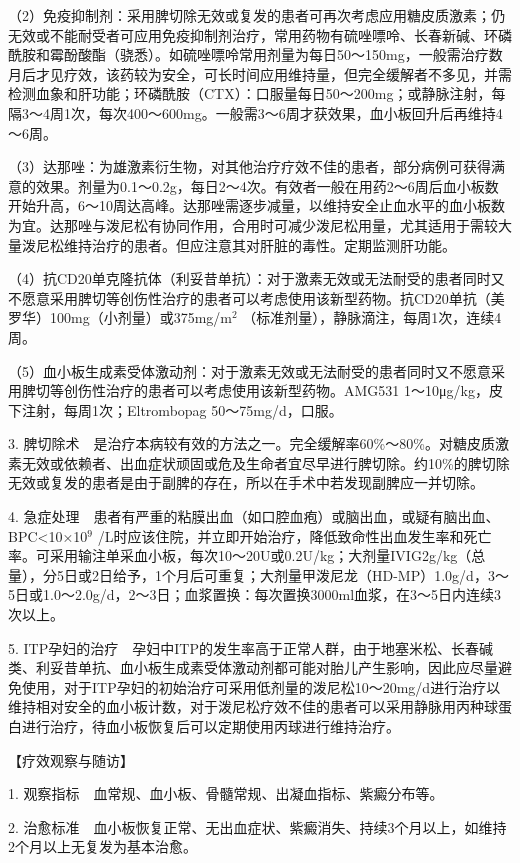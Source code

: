 （2）免疫抑制剂：采用脾切除无效或复发的患者可再次考虑应用糖皮质激素；仍无效或不能耐受者可应用免疫抑制剂治疗，常用药物有硫唑嘌呤、长春新碱、环磷酰胺和霉酚酸酯（骁悉）。如硫唑嘌呤常用剂量为每日50～150mg，一般需治疗数月后才见疗效，该药较为安全，可长时间应用维持量，但完全缓解者不多见，并需检测血象和肝功能；环磷酰胺（CTX）：口服量每日50～200mg；或静脉注射，每隔3～4周1次，每次400～600mg。一般需3～6周才获效果，血小板回升后再维持4～6周。

（3）达那唑：为雄激素衍生物，对其他治疗疗效不佳的患者，部分病例可获得满意的效果。剂量为0.1～0.2g，每日2～4次。有效者一般在用药2～6周后血小板数开始升高，6～10周达高峰。达那唑需逐步减量，以维持安全止血水平的血小板数为宜。达那唑与泼尼松有协同作用，合用时可减少泼尼松用量，尤其适用于需较大量泼尼松维持治疗的患者。但应注意其对肝脏的毒性。定期监测肝功能。

（4）抗CD20单克隆抗体（利妥昔单抗）：对于激素无效或无法耐受的患者同时又不愿意采用脾切等创伤性治疗的患者可以考虑使用该新型药物。抗CD20单抗（美罗华）100mg（小剂量）或375mg/m$^2$
（标准剂量），静脉滴注，每周1次，连续4周。

（5）血小板生成素受体激动剂：对于激素无效或无法耐受的患者同时又不愿意采用脾切等创伤性治疗的患者可以考虑使用该新型药物。AMG531
1～10μg/kg，皮下注射，每周1次；Eltrombopag
50～75mg/d，口服。

3.
脾切除术　是治疗本病较有效的方法之一。完全缓解率60\%～80\%。对糖皮质激素无效或依赖者、出血症状顽固或危及生命者宜尽早进行脾切除。约10\%的脾切除无效或复发的患者是由于副脾的存在，所以在手术中若发现副脾应一并切除。

4.
急症处理　患者有严重的粘膜出血（如口腔血疱）或脑出血，或疑有脑出血、BPC<10×10$^{9}$
/L时应该住院，并立即开始治疗，降低致命性出血发生率和死亡率。可采用输注单采血小板，每次10～20U或0.2U/kg；大剂量IVIG2g/kg（总量），分5日或2日给予，1个月后可重复；大剂量甲泼尼龙（HD-MP）1.0g/d，3～5日或1.0～2.0g/d，2～3日；血浆置换：每次置换3000ml血浆，在3～5日内连续3次以上。

5.
ITP孕妇的治疗　孕妇中ITP的发生率高于正常人群，由于地塞米松、长春碱类、利妥昔单抗、血小板生成素受体激动剂都可能对胎儿产生影响，因此应尽量避免使用，对于ITP孕妇的初始治疗可采用低剂量的泼尼松10～20mg/d进行治疗以维持相对安全的血小板计数，对于泼尼松疗效不佳的患者可以采用静脉用丙种球蛋白进行治疗，待血小板恢复后可以定期使用丙球进行维持治疗。

【疗效观察与随访】

1. 观察指标　血常规、血小板、骨髓常规、出凝血指标、紫癜分布等。

2.
治愈标准　血小板恢复正常、无出血症状、紫癜消失、持续3个月以上，如维持2个月以上无复发为基本治愈。

